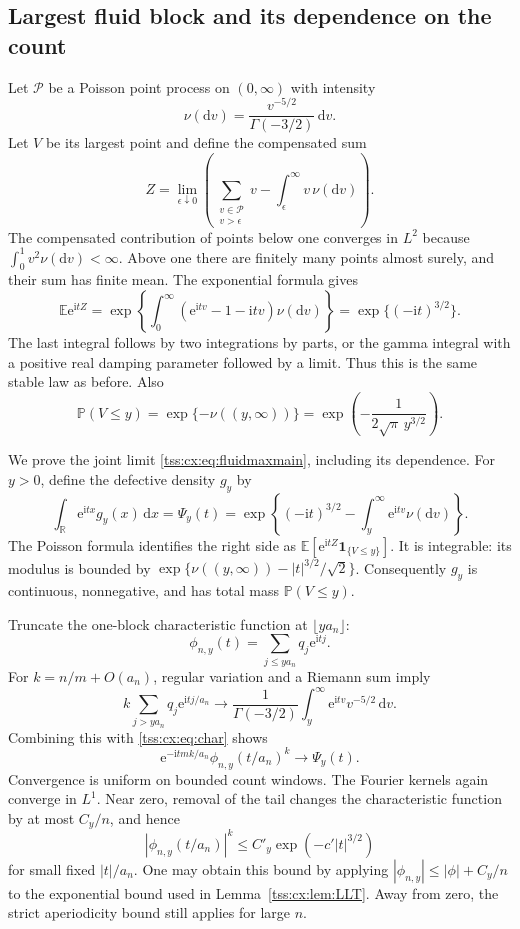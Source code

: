 \documentclass[11pt]{article}
\theoremstyle{remark}\newtheorem{remark}[theorem]{Remark}
\theoremstyle{definition}\newtheorem{definition}[theorem]{Definition}
\newcommand{\ii}{\mathrm i}
\newcommand{\dd}{\mathrm d}
\newcommand{\e}{\mathrm e}
\newcommand{\E}{\mathbb E}
\newcommand{\Prob}{\mathbb P}
\newcommand{\R}{\mathbb R}
\newcommand{\ind}{\mathbf 1}
\begin{document}
\subsection{Largest fluid block and its dependence on the count}
\label{tss:cx:sec:fluidmax}
Let $\mathcal P$ be a Poisson point process on $(0,\infty)$ with
intensity
\[
 \nu(\dd v)=\frac{v^{-5/2}}{\Gamma(-3/2)}\,\dd v.
\]
Let $V$ be its largest point and define the compensated sum
\begin{equation}\label{tss:cx:eq:PPPstable}
 Z=\lim_{\epsilon\downarrow0}
 \left(\sum_{\substack{v\in\mathcal P\\v>\epsilon}}v
       -\int_\epsilon^\infty v\,\nu(\dd v)\right).
\end{equation}
The compensated contribution of points below one converges in
$L^2$ because $\int_0^1v^2\nu(\dd v)<\infty$. Above one there are
finitely many points almost surely, and their sum has finite mean.
The exponential formula gives
\[
 \E\e^{\ii tZ}
 =\exp\left\{\int_0^\infty
       (\e^{\ii tv}-1-\ii tv)\nu(\dd v)\right\}
 =\exp\{(-\ii t)^{3/2}\}.
\]
The last integral follows by two integrations by parts, or the
gamma integral with a positive real damping parameter followed by
a limit. Thus this is the same stable law as before. Also
\[
 \Prob(V\le y)=\exp\{-\nu((y,\infty))\}
 =\exp\left(-\frac1{2\sqrt\pi\,y^{3/2}}\right).
\]

We prove the joint limit \eqref{tss:cx:eq:fluidmaxmain}, including its
dependence. For $y>0$, define the defective density $g_y$ by
\begin{equation}\label{tss:cx:eq:defective}
 \int_\R\e^{\ii tx}g_y(x)\,\dd x
 =\Psi_y(t)
 =\exp\left\{(-\ii t)^{3/2}
       -\int_y^\infty \e^{\ii tv}\nu(\dd v)\right\}.
\end{equation}
The Poisson formula identifies the right side as
$\E[\e^{\ii tZ}\ind_{\{V\le y\}}]$. It is integrable: its modulus
is bounded by
$\exp\{\nu((y,\infty))-|t|^{3/2}/\sqrt2\}$.
Consequently $g_y$ is continuous, nonnegative, and has total mass
$\Prob(V\le y)$.

Truncate the one-block characteristic function at $\lfloor ya_n\rfloor$:
\[
 \phi_{n,y}(t)=\sum_{j\le ya_n}q_j\e^{\ii tj}.
\]
For $k=n/m+O(a_n)$, regular variation and a Riemann sum imply
\[
 k\sum_{j>ya_n}q_j\e^{\ii tj/a_n}
 \longrightarrow
 \frac1{\Gamma(-3/2)}\int_y^\infty\e^{\ii tv}v^{-5/2}\,\dd v.
\]
Combining this with \eqref{tss:cx:eq:char} shows
\[
 \e^{-\ii tmk/a_n}\phi_{n,y}(t/a_n)^k\longrightarrow\Psi_y(t).
\]
Convergence is uniform on bounded count windows. The Fourier kernels
again converge in $L^1$. Near zero, removal of the tail changes the
characteristic function by at most $C_y/n$, and hence
\[
 |\phi_{n,y}(t/a_n)|^k
 \le C'_y\exp(-c'|t|^{3/2})
\]
for small fixed $|t|/a_n$. One may obtain this bound by applying
$|\phi_{n,y}|\le|\phi|+C_y/n$ to the exponential bound used in
Lemma~\ref{tss:cx:lem:LLT}. Away from zero, the strict aperiodicity bound
still applies for large $n$.
\end{document}
